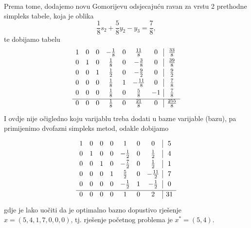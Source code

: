 \documentclass[a4paper, utf8, 11pt, colorlinks]{book}
\theoremstyle{definition}
\begin{document}
Prema tome, dodajemo novu Gomorijevu odsjecajuću ravan za vrstu 2 prethodne simpleks tabele, koja je oblika
$$  \frac{1}{8}s_2 + \frac{5}{8} y_2 - y_3 = \frac{7}{8},$$
te dobijamo tabelu
$$ \begin{array}{ccccccc| c}\vspace{1mm}
1    &   0   &   0   &  -\frac{1}{8}   &   0    &    \frac{11}{8}    & 0 & \frac{33}{8} \\\vspace{1mm}
0    &   1   &   0   &   \frac{1}{8}   &   0    &    -\frac{3}{8}    & 0 & \frac{39}{8} \\\vspace{1mm}
0    &   0   &   1   &   \frac{1}{2}   &   0    &    - \frac{9}{2}   & 0 & \frac{9}{2} \\\vspace{1mm}
0    &   0   &   0   &   \frac{1}{8}   &   1    &    - \frac{11}{8}  & 0    & \frac{7}{8} \\ \vspace{1mm}
0    &   0   &   0   &   \frac{1}{8}   &   0    &    \frac{5}{8}     & -1 & \frac{7}{8} \\ \hline\vspace{1mm}
0    &   0   &   0   &   \frac{1}{8}   &   0    &     \frac{21}{8}   & 0 & \frac{255}{8}   
\end{array} $$
I ovdje nije očigledno koju   varijablu treba dodati u bazne varijable (bazu), pa primijenimo dvofazni simpleks metod, odakle dobijamo 

$$ \begin{array}{ccccccc| c}\vspace{1mm}
    1    &   0   &   0   &  0 &  1  &   0    &    0    & 5  \\\vspace{1mm}
0    &   1   &   0   &  0   &   -\frac{1}{2}    &   0   & \frac{1}{2} & 4 \\\vspace{1mm}
0    &   0   &   1   &  0   &   -\frac{7}{2}    &   0   & \frac{1}{2} & 1 \\\vspace{1mm}
0    &   0   &   0   &  1  &   \frac{5}{2}    &  0 &  -\frac{11}{2}    & 7 \\ \vspace{1mm}
0    &   0   &   0   &   0 &  -\frac{1}{2}    &   1   & - \frac{1}{2} & 0\\ \hline\vspace{1mm}
0    &   0   &   0   &  0  &   1    &    0   & 2 & 31  
\end{array} 
$$
gdje je lako uočiti da je optimalno bazno dopustivo rješenje $x=(5, 4, 1, 7, 0, 0, 0 )$, tj. rješenje početnog problema je $x^*=(5, 4)$.
\end{document}
